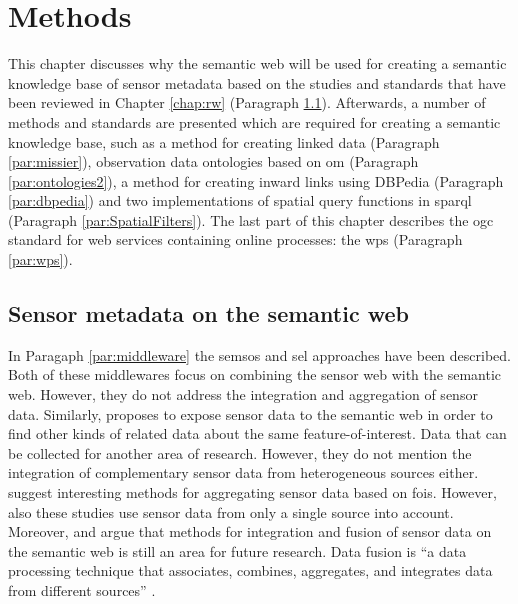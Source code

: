 


\chapter{Methods}
\label{chap:methods}

This chapter discusses why the semantic web will be used for creating a semantic knowledge base of sensor metadata based on the studies and standards that have been reviewed in Chapter \ref{chap:rw} (Paragraph \ref{par:LDmetadata}). Afterwards, a number of methods and standards are presented which are required for creating a semantic knowledge base, such as a method for creating linked data (Paragraph \ref{par:missier}), observation data ontologies based on \ac{om} (Paragraph \ref{par:ontologies2}), a method for creating inward links using DBPedia (Paragraph \ref{par:dbpedia}) and two implementations of spatial query functions in \ac{sparql} (Paragraph \ref{par:SpatialFilters}). The last part of this chapter describes the \ac{ogc} standard for web services containing online processes: the \acf{wps} (Paragraph \ref{par:wps}).   

\section{Sensor metadata on the semantic web}
\label{par:LDmetadata}
In Paragaph \ref{par:middleware} the \ac{semsos} \citep{SSW:Henson, SSW:Pschorr} and \ac{sel} \citep{SSW:Janowicz} approaches have been described. Both of these middlewares focus on combining the sensor web with the semantic web. However, they do not address the integration and aggregation of sensor data. Similarly, \cite{SSW:Atkinson} proposes to expose sensor data to the semantic web in order to find other kinds of related data about the same feature-of-interest. Data that can be collected for another area of research. However, they do not mention the integration of complementary sensor data from heterogeneous sources either. \citet{SSW:Stasch3,SSW:Stasch} suggest interesting methods for aggregating sensor data based on \acfp{foi}. However, also these studies use sensor data from only a single source into account. Moreover, \cite{SSW:Corcho} and \cite{SSW:Ji} argue that methods for integration and fusion of sensor data on the semantic web is still an area for future research. Data fusion is \enquote{a data processing technique that associates, combines, aggregates, and integrates data from different sources} \cite[p. 2]{SSW:Wang2}. 

